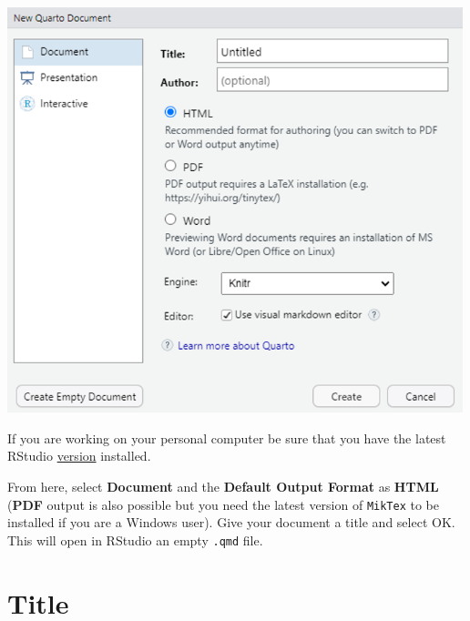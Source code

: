 \documentclass[
  letterpaper,
  DIV=11,
  numbers=noendperiod]{scrartcl}
\begin{document}
\begin{center}
\includegraphics[width=5.20833in,height=\textheight]{images/quarto1.png}
\end{center}

\begin{tcolorbox}[enhanced jigsaw, left=2mm, toprule=.15mm, title=\textcolor{quarto-callout-important-color}{\faExclamation}\hspace{0.5em}{Important}, colbacktitle=quarto-callout-important-color!10!white, toptitle=1mm, titlerule=0mm, breakable, opacityback=0, bottomrule=.15mm, coltitle=black, arc=.35mm, rightrule=.15mm, bottomtitle=1mm, colframe=quarto-callout-important-color-frame, leftrule=.75mm, opacitybacktitle=0.6, colback=white]

If you are working on your personal computer be sure that you have the
latest RStudio
\href{https://posit.co/download/rstudio-desktop/}{version} installed.

\end{tcolorbox}

From here, select \textbf{Document} and the \textbf{Default Output
Format} as \textbf{HTML} (\textbf{PDF} output is also possible but you
need the latest version of \texttt{MikTex} to be installed if you are a
Windows user). Give your document a title and select OK. This will open
in RStudio an empty \texttt{.qmd} file.

\section{Title}\label{sec-title}
\end{document}
